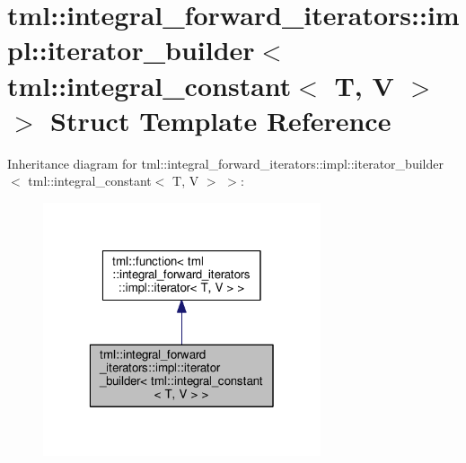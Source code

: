 \hypertarget{structtml_1_1integral__forward__iterators_1_1impl_1_1iterator__builder_3_01tml_1_1integral__constant_3_01_t_00_01_v_01_4_01_4}{\section{tml\+:\+:integral\+\_\+forward\+\_\+iterators\+:\+:impl\+:\+:iterator\+\_\+builder$<$ tml\+:\+:integral\+\_\+constant$<$ T, V $>$ $>$ Struct Template Reference}
\label{structtml_1_1integral__forward__iterators_1_1impl_1_1iterator__builder_3_01tml_1_1integral__constant_3_01_t_00_01_v_01_4_01_4}
}


Inheritance diagram for tml\+:\+:integral\+\_\+forward\+\_\+iterators\+:\+:impl\+:\+:iterator\+\_\+builder$<$ tml\+:\+:integral\+\_\+constant$<$ T, V $>$ $>$\+:
\nopagebreak
\begin{figure}[H]
\begin{center}
\leavevmode
\includegraphics[width=232pt]{structtml_1_1integral__forward__iterators_1_1impl_1_1iterator__builder_3_01tml_1_1integral__cons0518b76fc7ed9bc7cfd3a89fb7a0d958}
\end{center}
\end{figure}


